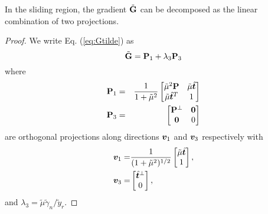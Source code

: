 \begin{lemma}
In the sliding region, the gradient $\tilde{{\mathbf{G}}}$ can be decomposed as the linear
combination of two projections.
\end{lemma}
\begin{proof}
We write Eq. (\ref{eq:Gtilde}) as
	\begin{equation}
		\tilde{{\mathbf{G}}} = {\mathbf{P}}_1 + \lambda_3 {\mathbf{P}}_3
	\end{equation}	
	where
	\begin{eqnarray}
		{\mathbf{P}}_1 &=& 
		\frac{1}{1+\tilde\mu^2}
			\begin{bmatrix}
				\tilde\mu^2{\mathbf{P}} & \tilde\mu\hat{{\bm{t}}}\\
				\tilde\mu\hat{{\bm{t}}}^T & 1 \end{bmatrix}\\
		{\mathbf{P}}_3 &=& 		
			\begin{bmatrix}
				{\mathbf{P}}^\perp & {\mathbf{0}}\\
				{\mathbf{0}} & 0
			\end{bmatrix}
	\end{eqnarray}
are orthogonal projections along directions ${\bm{v}}_1$ and ${\bm{v}}_3$
respectively with
\begin{eqnarray}
	{\bm{v}}_1 =& \frac{1}{(1+\tilde\mu^2)^{1/2}}
	\begin{bmatrix}
		\tilde\mu\hat{{\bm{t}}}\\
		1 \end{bmatrix},\\
	{\bm{v}}_3 =& 
	\begin{bmatrix}
		\hat{{\bm{t}}}^\perp\\
		0 \end{bmatrix},
\end{eqnarray}
and $\lambda_3 = \tilde\mu\tilde\gamma_n/\tilde{y}_r$.
\end{proof}
		

